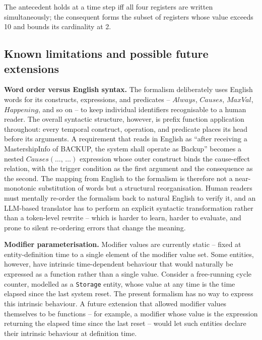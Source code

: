 The antecedent holds at a time step iff all four registers are written simultaneously; the consequent forms the subset of registers whose value exceeds 10 and bounds its cardinality at 2.

\subsection{Known limitations and possible future extensions}\label{subsec:limitations}

\textbf{Word order versus English syntax.} The formalism deliberately uses English words for its constructs, expressions, and predicates -- $\mathit{Always}$, $\mathit{Causes}$, $\mathit{MaxVal}$, $\mathit{Happening}$, and so on -- to keep individual identifiers recognisable to a human reader. The overall syntactic structure, however, is prefix function application throughout: every temporal construct, operation, and predicate places its head before its arguments. A requirement that reads in English as ``after receiving a MastershipInfo of BACKUP, the system shall operate as Backup'' becomes a nested $\mathit{Causes}(\dots,\, \dots)$ expression whose outer construct binds the cause-effect relation, with the trigger condition as the first argument and the consequence as the second. The mapping from English to the formalism is therefore not a near-monotonic substitution of words but a structural reorganisation. Human readers must mentally re-order the formalism back to natural English to verify it, and an LLM-based translator has to perform an explicit syntactic transformation rather than a token-level rewrite -- which is harder to learn, harder to evaluate, and prone to silent re-ordering errors that change the meaning.

\textbf{Modifier parameterisation.} Modifier values are currently static -- fixed at entity-definition time to a single element of the modifier value set. Some entities, however, have intrinsic time-dependent behaviour that would naturally be expressed as a function rather than a single value. Consider a free-running cycle counter, modelled as a \texttt{Storage} entity, whose value at any time is the time elapsed since the last system reset. The present formalism has no way to express this intrinsic behaviour. A future extension that allowed modifier values themselves to be functions -- for example, a modifier whose value is the expression returning the elapsed time since the last reset -- would let such entities declare their intrinsic behaviour at definition time.

